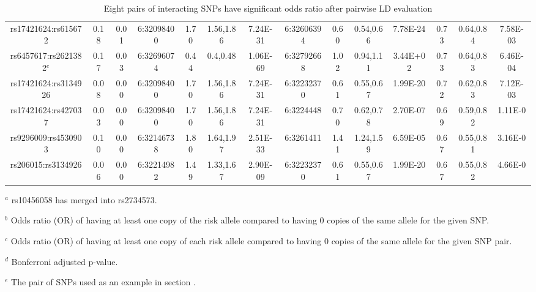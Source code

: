 \documentclass[preprint,12pt,3p]{elsarticle}
\begin{document}
\begin{sidewaystable}
\begin{center}
\begin{tabularx}{\textwidth}{|c|c|c|c|c|c|c|c|c|c|c|c|c|c||}
 rs17421624:rs615672      & 0.18 & 0.01 & 6:32098400  & 1.70 & 1.56,1.86 & 7.24E-31 & 6:32606394 & 0.60 & 0.54,0.66 &  7.78E-24& 0.73 & 0.64,0.84 & 7.58E-03 \\
 rs6457617:rs2621382$^e$      & 0.17 & 0.03 & 6:32696074  & 0.44 & 0.4,0.48  & 1.06E-69 & 6:32792668 & 1.02 & 0.94,1.11 &  3.44E+02& 0.73 & 0.64,0.83 & 6.46E-04 \\
 rs17421624:rs3134926     & 0.08 & 0.00 & 6:32098400  & 1.70 & 1.56,1.86 & 7.24E-31 & 6:32232370 & 0.61 & 0.55,0.67 &  1.99E-20& 0.72 & 0.62,0.83 & 7.12E-03 \\
 rs17421624:rs427037      & 0.03 & 0.00 & 6:32098400  & 1.70 & 1.56,1.86 & 7.24E-31 & 6:3224448  & 0.70 & 0.62,0.78 &  2.70E-07& 0.69 & 0.59,0.82 & 1.11E-0  \\
rs9296009:rs4530903       & 0.10 & 0.00 & 6:32146738  & 1.80 & 1.64,1.97 & 2.51E-33 & 6:3261411  & 1.41 & 1.24,1.59 &  6.59E-05& 0.67 & 0.55,0.81 & 3.16E-0  \\
rs206015:rs3134926        & 0.06 & 0.00 & 6:32214982  & 1.49 & 1.33,1.67 & 2.90E-09 & 6:32232370 & 0.61 & 0.55,0.67 &  1.99E-20& 0.67 & 0.55,0.82 & 4.66E-0  \\
\hline
\end{tabularx}
 \end{center}
 \caption{Eight pairs of interacting SNPs have significant odds ratio after pairwise LD evaluation}
 \label{table:eight.pairs}
 \begin{tablenotes}%
 \item[$^{a}$] rs10456058 has merged into rs2734573.
 \item[$^{b}$]  Odds ratio (OR) of having at least one copy of the risk allele compared to having 0 copies of the same allele for the given SNP.
 \item[$^{c}$]  Odds ratio (OR) of having at least one copy of each risk allele compared to having 0 copies of the same allele for the given SNP pair.
 \item[$^{d}$]  Bonferroni adjusted p-value.
 \item[$^e$]   The pair of SNPs used as an example in section \label{section:A_linear_model_example}.
 \end{tablenotes}
\end{sidewaystable}
\end{document}
